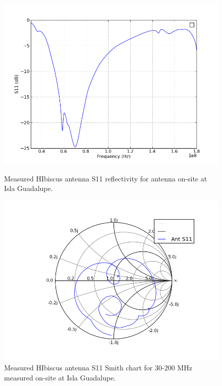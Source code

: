 \begin{figure}[htb]
\centering
\begin{minipage}[b]{0.51\textwidth}
\centering
\includegraphics[width=0.95\linewidth]{SCIHI_system/figures/HIbiscus_S11_dB_70MHz.png}
\caption{Measured HIbiscus antenna S11 reflectivity for antenna on-site at Isla Guadalupe. }
\label{Fig:HIS11_dB_70}
\end{minipage}%
\begin{minipage}[b]{0.02\textwidth}
\hspace{1cm}
\end{minipage}%
\begin{minipage}[b]{0.46\textwidth}
\centering
\includegraphics[width=0.95\linewidth]{SCIHI_system/figures/HIbiscus_S11_meas_smith.png}
\caption{Measured HIbiscus antenna S11 Smith chart for 30-200 MHz measured on-site at Isla Guadalupe.}
\label{Fig:HIS11_Smith_70}
\end{minipage}
\end{figure}

